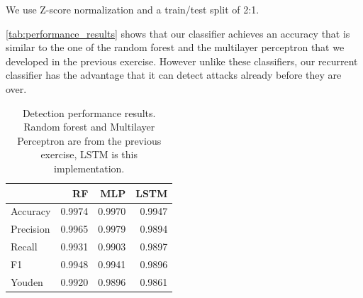 \documentclass[conference]{IEEEtran}
\begin{document}
We use Z-score normalization and a train/test split of 2:1.

\autoref{tab:performance_results} shows that our classifier achieves an accuracy that is similar to the one of the random forest and the multilayer perceptron that we developed in the previous exercise. However unlike these classifiers, our recurrent classifier has the advantage that it can detect attacks already before they are over.

\begin{table}
\caption{Detection performance results. Random forest and Multilayer Perceptron are from the previous exercise, LSTM is this implementation.} \label{tab:performance_results}
\centering
\begin{tabular}{l r r r} \toprule
& RF & MLP & LSTM \\ \midrule
Accuracy	&	0.9974 & 0.9970	& 0.9947 \\
Precision	&	0.9965 & 0.9979 & 0.9894	\\
Recall	&	0.9931 & 0.9903	& 0.9897 \\
F1	&	0.9948 & 0.9941	& 0.9896 \\
Youden	&	0.9920 & 0.9896 & 0.9861 \\
\bottomrule
\end{tabular}
\end{table}
%
%
%
%
\end{document}
